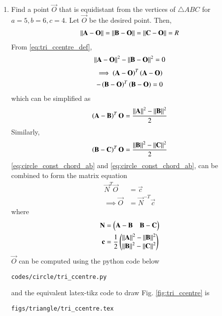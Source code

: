 \renewcommand{\theequation}{\theenumi}
\begin{enumerate}[label=\arabic*.,ref=\thesubsection.\theenumi]

\item Find a point $\vec{O}$ that is equidistant from the vertices of $\triangle ABC$ for $a = 5, b = 6, c = 4$.
%
\solution Let $\vec{O}$ be the desired point.  Then,
\begin{align}
\label{eq:tri_ccentre_def}
\left\lVert\mathbf{A}-\mathbf{O}\right\rVert = \left\lVert\mathbf{B}-\mathbf{O}\right\rVert = 
\left\lVert\mathbf{C}-\mathbf{O}\right\rVert = R
\end{align}
From \eqref{eq:tri_ccentre_def},
\begin{align}
\label{eq:circle_const_AB}
\left\lVert\mathbf{A}-\mathbf{O}\right\rVert^2 - \left\lVert\mathbf{B}-\mathbf{O}\right\rVert^2  = 0
\end{align}
\begin{multline}
\implies \left(\mathbf{A}-\mathbf{O}\right)^T\left(\mathbf{A}-\mathbf{O}\right) 
\\
- \left(\mathbf{B}-\mathbf{O}\right)^T\left(\mathbf{B}-\mathbf{O}\right) = 0
\end{multline}
%
which can be simplified as
\begin{align}
\label{eq:circle_const_chord_ab}
\left(\mathbf{A}-\mathbf{B}\right)^T\mathbf{O} =   \frac{\left\lVert\mathbf{A}\right\rVert^2- \left\lVert\mathbf{B}\right\rVert^2}{2}
\end{align}
Similarly,
\begin{align}
\label{eq:circle_const_chord_bc}
\left(\mathbf{B}-\mathbf{C}\right)^T\mathbf{O} =   \frac{\left\lVert\mathbf{B}\right\rVert^2- \left\lVert\mathbf{C}\right\rVert^2}{2}
\end{align}
%
\eqref{eq:circle_const_chord_ab} and \eqref{eq:circle_const_chord_ab}, can be combined to form the matrix equation 
%
\begin{align}
\vec{N}^T\vec{O} &= \vec{c}
\\
\implies \vec{O} &= \vec{N}^{-T} \vec{c}
\label{eq:circle_const_chord_mat}
\end{align}
%
where 
%
\begin{align}
\mathbf{N} &= \begin{pmatrix}\mathbf{A}-\mathbf{B} & \mathbf{B}-\mathbf{C}\end{pmatrix}
\\
\mathbf{c} &= \frac{1}{2}\begin{pmatrix}\left\lVert\mathbf{A}\right\rVert^2- \left\lVert\mathbf{B}\right\rVert^2 \\ \left\lVert\mathbf{B}\right\rVert^2- \left\lVert\mathbf{C}\right\rVert^2\end{pmatrix}
\end{align}
%
$\vec{O}$ can be computed using 
%
the python code below
%
\begin{lstlisting}
codes/circle/tri_ccentre.py
\end{lstlisting}
%
and the equivalent latex-tikz code to draw Fig. \ref{fig:tri_ccentre} is
%
\begin{lstlisting}
figs/triangle/tri_ccentre.tex
\end{lstlisting}
%
\begin{figure}[!ht]
	\begin{center}
		

\end{center}
\end{figure}
\end{enumerate}
